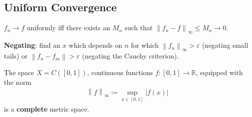 \hypertarget{uniform-convergence}{%
\subsection{Uniform Convergence}\label{uniform-convergence}}

\begin{proposition}

\(f_n \to f\) uniformly iff there exists an \(M_n\) such that
\({\left\lVert {f_n - f} \right\rVert}_\infty \leq M_n \to 0\).

\end{proposition}

\begin{remark}

\textbf{Negating}: find an \(x\) which depends on \(n\) for which
\({\left\lVert {f_n} \right\rVert}_\infty > {\varepsilon}\) (negating
small tails) or
\({\left\lVert {f_n - f_m} \right\rVert} > {\varepsilon}\) (negating the
Cauchy criterion).

\end{remark}

\begin{proposition}[$C(I)$ is complete]

The space \(X = C([0, 1])\), continuous functions
\(f: [0, 1] \to {\mathbb{R}}\), equipped with the norm
\begin{align*}
{\left\lVert {f} \right\rVert}_\infty \coloneqq\sup_{x\in [0, 1]} {\left\lvert {f(x)} \right\rvert}
\end{align*}
is a \textbf{complete} metric space.

\end{proposition}

